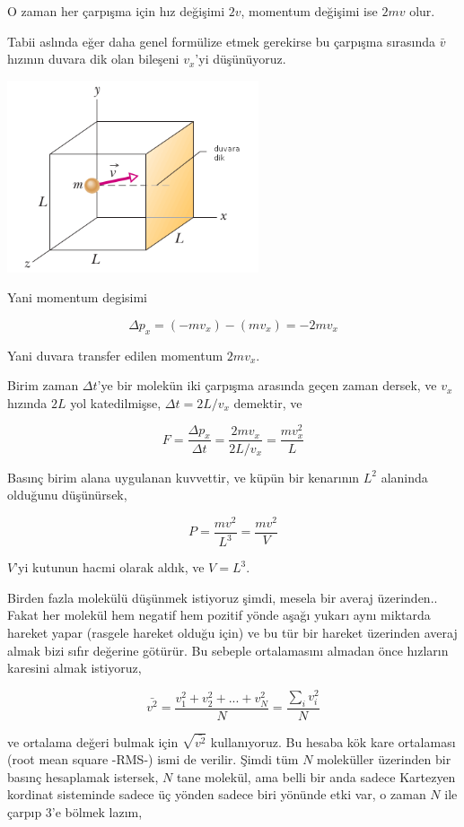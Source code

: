 \documentclass[12pt,fleqn]{article}\usepackage{../../common}
\begin{document}
O zaman her çarpışma için hız değişimi $2v$, momentum değişimi ise $2mv$
olur.

Tabii aslında eğer daha genel formülize etmek gerekirse bu çarpışma sırasında
$\bar{v}$ hızının duvara dik olan bileşeni $v_x$'yi düşünüyoruz.

\includegraphics[width=20em]{phy_005_basics_05.png}

Yani momentum degisimi

$$
\Delta p_x = (-m v_x) - (m v_x) = - 2 m v_x 
$$

Yani duvara transfer edilen momentum $2 m v_x$. 

Birim zaman $\Delta t$'ye bir molekün iki çarpışma arasında geçen zaman dersek,
ve $v_x$ hızında $2L$ yol katedilmişse, $\Delta t  = 2 L / v_x$ demektir, ve

$$
F = \frac{\Delta p_x}{\Delta t} = \frac{2 m v_x}{2 L / v_x} = \frac{m v_x^2}{L}
$$

Basınç birim alana uygulanan kuvvettir, ve küpün bir kenarının $L^2$ alaninda
olduğunu düşünürsek, 

$$
P = \frac{m v^2}{L^3} = \frac{m v^2}{V}
$$

$V$'yi kutunun hacmi olarak aldık, ve $V = L^3$.

Birden fazla molekülü düşünmek istiyoruz şimdi, mesela bir averaj
üzerinden.. Fakat her molekül hem negatif hem pozitif yönde aşağı yukarı aynı
miktarda hareket yapar (rasgele hareket olduğu için) ve bu tür bir hareket
üzerinden averaj almak bizi sıfır değerine götürür. Bu sebeple ortalamasını
almadan önce hızların karesini almak istiyoruz,

$$
\bar{v^2} = \frac{v_1^2 + v_2^2 + ... + v_N^2 }{N} = \frac{\sum_i v_i^2}{N}
$$

ve ortalama değeri bulmak için $\sqrt{\bar{v^2}}$ kullanıyoruz. Bu hesaba kök
kare ortalaması (root mean square -RMS-) ismi de verilir. Şimdi tüm $N$
moleküller üzerinden bir basınç hesaplamak istersek, $N$ tane molekül, ama belli
bir anda sadece Kartezyen kordinat sisteminde sadece üç yönden sadece biri
yönünde etki var, o zaman $N$ ile çarpıp 3'e bölmek lazım, 
\end{document}
